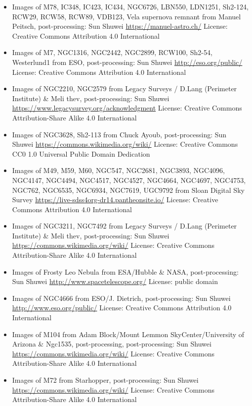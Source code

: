 \begin{itemize}
\item Images of M78, IC348, IC423, IC434, NGC6726, LBN550, LDN1251, Sh2-124, RCW29,
	 RCW58, RCW89, VDB123, Vela supernova remnant
	 from Manuel Peitsch, post-processing: Sun Shuwei
	 \url{https://manuel-astro.ch/}
	 License: Creative Commons Attribution 4.0 International
\item Images of M7, NGC1316, NGC2442, NGC2899, RCW100, Sh2-54, Westerlund1
	 from ESO, post-processing: Sun Shuwei
	 \url{http://eso.org/public/}
	 License: Creative Commons Attribution 4.0 International
\item Images of NGC2210, NGC2579
	 from Legacy Surveys / D.Lang (Perimeter Institute) \& Meli thev, post-processing: Sun Shuwei
	 \url{https://www.legacysurvey.org/acknowledgment}
	 License: Creative Commons Attribution-Share Alike 4.0 International
\item Images of NGC3628, Sh2-113
	 from Chuck Ayoub, post-processing: Sun Shuwei
	 \url{https://commons.wikimedia.org/wiki/}
	 License: Creative Commons CC0 1.0 Universal Public Domain Dedication
\item Images of M49, M59, M60, NGC547, NGC2681, NGC3893, NGC4096, NGC4147, NGC4494,
	 NGC4517, NGC4527, NGC4664, NGC4697, NGC4753, NGC762, NGC6535, NGC6934,
	 NGC7619, UGC9792
	 from Sloan Digital Sky Survey
	 \url{https://live-sdss4org-dr14.pantheonsite.io/}
	 License: Creative Commons Attribution 4.0 International 
\item Images of NGC3211, NGC7492
	 from Legacy Surveys / D.Lang (Perimeter Institute) \& Meli thev, post-processing: Sun Shuwei
	 \url{https://commons.wikimedia.org/wiki/}
	 License: Creative Commons Attribution-Share Alike 4.0 International
\item Images of Frosty Leo Nebula
	 from ESA/Hubble \& NASA, post-processing: Sun Shuwei
	 \url{http://www.spacetelescope.org/}
	 License: public domain
\item Images of NGC4666
	 from ESO/J. Dietrich, post-processing: Sun Shuwei
	 \url{http://www.eso.org/public/}
	 License: Creative Commons Attribution 4.0 International
\item Images of M104
	 from Adam Block/Mount Lemmon SkyCenter/University of Arizona \& Ngc1535, post-processing, post-processing: Sun Shuwei
	 \url{https://commons.wikimedia.org/wiki/}
	 License: Creative Commons Attribution-Share Alike 4.0 International
\item Images of M72
	 from Starhopper, post-processing: Sun Shuwei
	 \url{https://commons.wikimedia.org/wiki/}
	 License: Creative Commons Attribution-Share Alike 4.0 International

\end{itemize}
